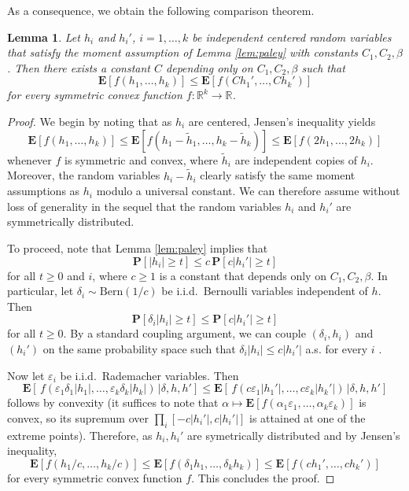 \documentclass[10pt,reqno]{amsart}
\newtheorem{lem}[thm]{Lemma}
\theoremstyle{definition}
\numberwithin{equation}{section}
\numberwithin{figure}{section}
\numberwithin{table}{section}
\begin{document}
As a consequence, we obtain the following comparison theorem.

\begin{lem}
\label{lem:cfconvex}
Let $h_i$ and $h_i'$, $i=1,\ldots,k$ be independent centered random 
variables that satisfy the moment assumption of Lemma \ref{lem:paley}
with constants $C_1,C_2,\beta$. Then there exists a constant $C$
depending only on $C_1,C_2,\beta$ such that
$$
	\mathbf{E}[f(h_1,\ldots,h_k)] \le
	\mathbf{E}[f(Ch_1',\ldots,Ch_k')]
$$
for every symmetric convex function $f:\mathbb{R}^k\to\mathbb{R}$.
\end{lem}

\begin{proof}
We begin by noting that as $h_i$ are centered, Jensen's inequality yields
$$
	\mathbf{E}[f(h_1,\ldots,h_k)] \le
	\mathbf{E}[f(h_1-\tilde h_1,\ldots,h_k-\tilde h_k)] \le
	\mathbf{E}[f(2h_1,\ldots,2h_k)]
$$
whenever $f$ is symmetric and convex, where $\tilde h_i$ are independent 
copies of $h_i$. Moreover, the random variables $h_i-\tilde h_i$
clearly satisfy the same moment assumptions as $h_i$ modulo
a universal constant. We can therefore assume without loss of generality
in the sequel that the random variables $h_i$ and $h_i'$ are 
symmetrically distributed.

To proceed, note that Lemma \ref{lem:paley} implies that 
$$
	\mathbf{P}[|h_{i}|\ge t] \le 
        c\,\mathbf{P}[c|h_{i}'|\ge t]
$$
for all $t\ge 0$ and $i$, where $c\ge 1$ is a constant that depends only 
on $C_1,C_2,\beta$. In particular, let $\delta_i\sim\mathrm{Bern}(1/c)$ be 
i.i.d.\ Bernoulli variables independent of $h$. Then
$$
	\mathbf{P}[\delta_i|h_{i}|\ge t] 
	\le
	\mathbf{P}[c|h_{i}'|\ge t]
$$
for all $t\ge 0$. By a standard coupling argument, we can couple
$(\delta_i,h_i)$ and $(h_i')$ on the same probability space
such that $\delta_i|h_i| \le c|h_i'|$ a.s. for every $i$
\cite[p.\ 127]{Lin02}.

Now let $\varepsilon_i$ be i.i.d.\ Rademacher variables. Then
$$
	\mathbf{E}[\,f(\varepsilon_1\delta_1|h_1|,
	\ldots,\varepsilon_k\delta_k|h_k|)\,|\delta,h,h'] \le
	\mathbf{E}[\,f(c\varepsilon_1|h_1'|,\ldots,
	c\varepsilon_k|h_k'|)\,|\delta,h,h']
$$
follows by convexity (it suffices to note that
$\alpha\mapsto 
\mathbf{E}[f(\alpha_1\varepsilon_1,\ldots,\alpha_k\varepsilon_k)]$ is 
convex, so its supremum over $\prod_i[-c|h_i'|,c|h_i'|]$ is attained at
one of the extreme points).
Therefore, as $h_i,h_i'$ are symetrically distributed and by
Jensen's inequality,
$$
	\mathbf{E}[f(h_1/c,\ldots,h_k/c)] \le
	\mathbf{E}[f(\delta_1 h_1,\ldots,\delta_k h_k)] \le
	\mathbf{E}[f(ch_1',\ldots,ch_k')]
$$
for every symmetric convex function $f$. This concludes the proof.
\end{proof}
\end{document}
